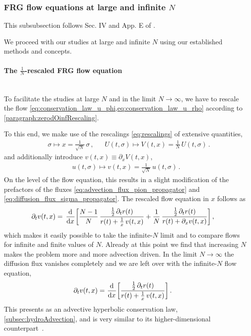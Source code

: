 \subsubsection{FRG flow equations at large and infinite \texorpdfstring{$N$}{N}}\label{subsubsec:FRGlargeN}
\begin{disclaimer}
	This subsubsection follows Sec. IV and App. E of .
\end{disclaimer}
We proceed with our \frg{} studies at large and infinite $N$ using our established \cfd{} methods and concepts.

\paragraph{The \texorpdfstring{$\tfrac{1}{N}$}{1/N}-rescaled FRG flow equation}\label{paragraph:FRGlargeN1overN}\mbox{}\\%
To facilitate the studies at large $N$ and in the limit $N\rightarrow\infty$, we have to rescale the flow \cref{eq:conservation_law_u_phi,eq:conservation_law_u_rho} according to \cref{paragraph:zerodOinfRescaling}.

To this end, we make use of the rescalings \eqref{eq:rescalings} of extensive quantities,
	\begin{align}
		&	\sigma \mapsto x = \tfrac{1}{\sqrt{N}} \, \sigma \, ,	&&	U ( t, \sigma ) \mapsto V ( t, x ) = \tfrac{1}{N} \,  U ( t, \sigma ) \, .
	\end{align}
and additionally introduce $v ( t, x ) \equiv \partial_x V ( t, x )$,
	\begin{align}
		u ( t, \sigma ) \mapsto v ( t, x ) = \tfrac{1}{\sqrt{N}} \, u ( t, \sigma ) \, .
	\end{align}
On the level of the \frg{} flow equation, this results in a slight modification of the prefactors of the fluxes \eqref{eq:advection_flux_pion_propagator} and \eqref{eq:diffusion_flux_sigma_propagator}.
The rescaled flow equation in $x$ follows as	
	\begin{align}
		\partial_t v ( t, x ) &=\, \dod{}{x}\! \bigg[ \frac{N - 1}{N} \, \frac{\tfrac{1}{2} \, \partial_t r ( t )}{r ( t ) + \frac{1}{x} \, v ( t, x )} + \frac{1}{N} \, \frac{\tfrac{1}{2} \, \partial_t r ( t )}{r ( t ) + \partial_x v ( t, x )} \bigg] \, ,\label{eq:frg_flow_x}
	\end{align}
which makes it easily possible to take the infinite-$N$ limit and to compare \frg{} flows for infinite and finite values of $N$. 
Already at this point we find that increasing $N$ makes the problem more and more advection driven.
In the limit $N \rightarrow \infty$ the diffusion flux vanishes completely and we are left over with the infinite-$N$ flow equation,
\begin{align}
	\partial_t v ( t, x ) = \, & \dod{}{x}\! \bigg[ \frac{\tfrac{1}{2} \, \partial_t r ( t )}{r ( t ) + \frac{1}{x} \, v ( t, x )}\bigg] \, . \label{eq:frg_flow_Ninf_x}
\end{align}
This \pde{} presents as an advective hyperbolic conservation law, \cf{} \cref{subsec:hydroAdvection}, and is very similar to its higher-dimensional counterpart~\cite{Tetradis:1995br,Litim:1995ex,Grossi:2019urj}.

